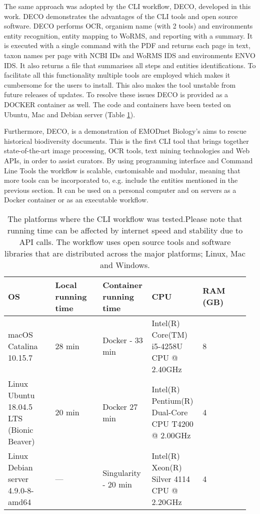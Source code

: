 The same approach was adopted by the CLI workflow, DECO, developed in this work.
DECO demonstrates the advantages of the CLI tools and open source software.
DECO performs OCR, organism name (with 2 tools) and environments entity recognition, entity mapping 
to WoRMS, and reporting with a summary. It is executed with a single command with 
the PDF and returns each page in text, taxon names per page with NCBI IDs and WoRMS IDS and environments
ENVO IDS. It also returns a file that summarises all steps and entities identifications.
To facilitate all this functionality multiple tools are employed which makes it 
cumbersome for the users to install. This also makes the tool unstable from 
future releases of updates. To resolve these issues DECO is provided as 
a DOCKER container as well. The code and containers have been tested on
Ubuntu, Mac and Debian server (Table \ref{table-CLI}).

Furthermore, DECO, is a demonstration of EMODnet Biology’s aims to rescue historical biodiversity documents.
This is the first CLI tool that brings together state-of-the-art image processing, OCR tools, text mining
technologies and Web APIs, in order to assist curators. By using programming
interface and Command Line Tools the workflow is scalable, customisable and
modular, meaning that more tools can be incorporated to, e.g. include the
entities mentioned in the previous section. It can be used on a
personal computer and on servers as a Docker container or as an executable workflow.

\begin{table}[ht]
    \begin{tabular}{p{0.192\linewidth}p{0.192\linewidth}p{0.192\linewidth}p{0.192\linewidth}p{0.192\linewidth}}
\hline
\textbf{OS} & \textbf{Local running time} & \textbf{Container running time} & \textbf{CPU} & \textbf{RAM (GB)} \\
\hline
macOS Catalina 10.15.7 & 28 min & Docker - 33 min & Intel(R) Core(TM) i5-4258U CPU @ 2.40GHz & 8 \\
Linux Ubuntu 18.04.5 LTS (Bionic Beaver) & 20 min & Docker  27 min & Intel(R) Pentium(R) Dual-Core CPU T4200 @ 2.00GHz & 4 \\
Linux Debian server 4.9.0-8-amd64 & --- & Singularity - 20 min & Intel(R) Xeon(R) Silver 4114 CPU @ 2.20GHz & 4
\end{tabular}%
\caption{The platforms where the CLI workflow was tested.Please note that running time can be affected by internet speed and stability due to API calls. The workflow uses open source tools and software libraries that are distributed across the major platforms; Linux, Mac and Windows.}
\label{table-CLI}
\end{table}

